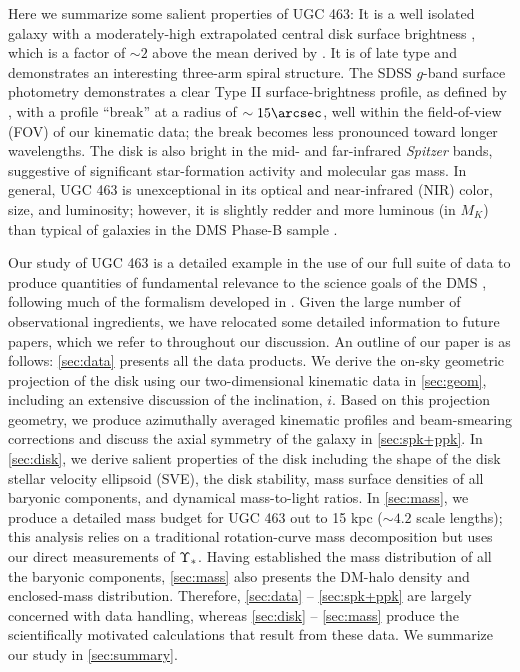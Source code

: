 \documentclass[apj,iop,numberedappendix]{emulateapj}
\begin{document}
Here we summarize some salient properties of UGC 463: It is a well isolated
galaxy with a moderately-high extrapolated central disk surface brightness
, which is a factor of $\sim2$ above the mean
derived by \citet{1970ApJ...160..811F}.  It is of late type
 and demonstrates an interesting
three-arm spiral structure.  The SDSS $g$-band surface photometry demonstrates a
clear Type II surface-brightness profile, as defined by
\citet{1970ApJ...160..811F}, with a profile ``break'' at a radius of
$\sim15\arcsec$, well within the field-of-view (FOV) of our kinematic data; the
break becomes less pronounced toward longer wavelengths.  The disk is also
bright in the mid- and far-infrared {\it Spitzer} bands, suggestive of
significant star-formation activity and molecular gas mass.  In general, UGC 463
is unexceptional in its optical and near-infrared (NIR) color, size, and
luminosity; however, it is slightly redder and more luminous (in $M_K$) than
typical of galaxies in the DMS Phase-B sample .

Our study of UGC 463 is a detailed example in the use of our full suite of data
to produce quantities of fundamental relevance to the science goals of the DMS
, following much of the formalism developed in
\citet[][hereafter ]{2010ApJ...716..234B}.
Given the large number of observational ingredients, we have relocated some
detailed information to future papers, which we refer to throughout our
discussion.  An outline of our paper is as follows: \sect \ref{sec:data}
presents all the data products.  We derive the on-sky geometric projection of
the disk using our two-dimensional kinematic data in \sect \ref{sec:geom},
including an extensive discussion of the inclination, $i$.  Based on this
projection geometry, we produce azimuthally averaged kinematic profiles and
beam-smearing corrections and discuss the axial symmetry of the galaxy in \sect
\ref{sec:spk+ppk}.  In \sect \ref{sec:disk}, we derive salient properties of the
disk including the shape of the disk stellar velocity ellipsoid (SVE), the disk
stability, mass surface densities of all baryonic components, and dynamical
mass-to-light ratios.  In \sect \ref{sec:mass}, we produce a detailed mass
budget for UGC 463 out to 15 kpc ($\sim 4.2$ scale lengths); this analysis
relies on a traditional rotation-curve mass decomposition but uses our direct
measurements of $\Upsilon_\ast$.  Having established the mass distribution of all the
baryonic components, \sect \ref{sec:mass} also presents the DM-halo density and
enclosed-mass distribution.  Therefore, \sects \ref{sec:data} --
\ref{sec:spk+ppk} are largely concerned with data handling, whereas \sects
\ref{sec:disk} -- \ref{sec:mass} produce the scientifically motivated
calculations that result from these data.  We summarize our study in \sect
\ref{sec:summary}.
\end{document}
